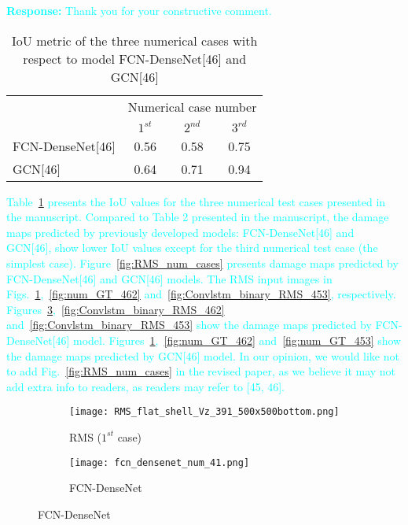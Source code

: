 \documentclass[11pt,a2paper]{report}
\begin{document}
\begin{enumerate}
\textcolor{Cyan}
{
	\textbf{Response:}
	Thank you for your constructive comment.\\
	\begin{table}[ht!]
		\centering
		\begin{tabular}{lccc}
			\toprule
			& \multicolumn{3}{l}{Numerical case number} \\
			& \(1^{st}\) & \(2^{nd}\) & \(3^{rd}\) \\ 
			\midrule
			FCN-DenseNet[46] & 0.56 & 0.58 & 0.75 \\
			GCN[46]          & 0.64 & 0.71 & 0.94 \\ 
			\bottomrule
		\end{tabular}
	\caption{IoU metric of the three numerical cases with respect to model FCN-DenseNet[46] and GCN[46]}
	\label{num_cases}
	\end{table}
Table~\ref{num_cases} presents the IoU values for the three numerical test cases presented in the manuscript.
Compared to Table 2 presented in the manuscript, the damage maps predicted by previously developed models: FCN-DenseNet[46] and GCN[46], show lower IoU values except for the third numerical test case (the simplest case).
Figure~\ref{fig:RMS_num_cases} presents damage maps predicted by FCN-DenseNet[46] and GCN[46] models.
The RMS input images in Figs.~\ref{fig:num_GT_391},~\ref{fig:num_GT_462} and~\ref{fig:Convlstm_binary_RMS_453}, respectively.
Figures~\ref{fig:Convlstm_binary_RMS_391},~\ref{fig:Convlstm_binary_RMS_462} and~\ref{fig:Convlstm_binary_RMS_453} show the damage maps predicted by FCN-DenseNet[46] model.
Figures~\ref{fig:num_GT_391},~\ref{fig:num_GT_462} and~\ref{fig:num_GT_453} show the damage maps predicted by GCN[46] model.
In our opinion, we would like not to add Fig.~\ref{fig:RMS_num_cases} in the revised paper, as we believe it may not add extra info to readers, as readers may refer to [45, 46].
}
	\begin{figure}[ht!]
		\centering
		\begin{subfigure}[b]{0.32\textwidth}
			\centering
			\texttt{[image: RMS\_flat\_shell\_Vz\_391\_500x500bottom.png]}
			\caption{RMS (\(1^{st}\) case)}
			\label{fig:num_GT_391}
		\end{subfigure}
		\hfill
		\begin{subfigure}[b]{0.32\textwidth}
			\centering
			\texttt{[image: fcn\_densenet\_num\_41.png]}
			\caption{FCN-DenseNet}
			\label{fig:Convlstm_binary_RMS_391}
		\end{subfigure}

\end{figure}
\end{enumerate}
\end{document}
